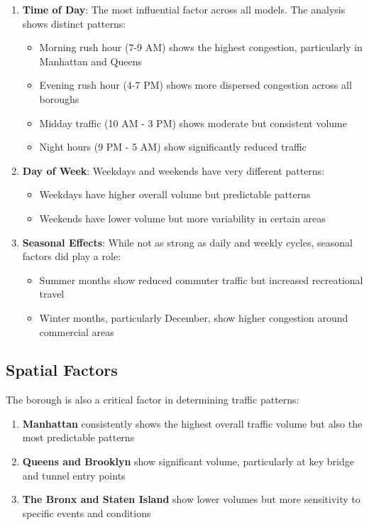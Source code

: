 \documentclass[
  letterpaper,
  DIV=11,
  numbers=noendperiod]{scrreprt}
\providecommand{\tightlist}{%
  \setlength{\itemsep}{0pt}\setlength{\parskip}{0pt}}\usepackage{longtable,booktabs,array}
\begin{document}
\begin{enumerate}
\def\labelenumi{\arabic{enumi}.}
\tightlist
\item
  \textbf{Time of Day}: The most influential factor across all models.
  The analysis shows distinct patterns:

  \begin{itemize}
  \tightlist
  \item
    Morning rush hour (7-9 AM) shows the highest congestion,
    particularly in Manhattan and Queens
  \item
    Evening rush hour (4-7 PM) shows more dispersed congestion across
    all boroughs
  \item
    Midday traffic (10 AM - 3 PM) shows moderate but consistent volume
  \item
    Night hours (9 PM - 5 AM) show significantly reduced traffic
  \end{itemize}
\item
  \textbf{Day of Week}: Weekdays and weekends have very different
  patterns:

  \begin{itemize}
  \tightlist
  \item
    Weekdays have higher overall volume but predictable patterns
  \item
    Weekends have lower volume but more variability in certain areas
  \end{itemize}
\item
  \textbf{Seasonal Effects}: While not as strong as daily and weekly
  cycles, seasonal factors did play a role:

  \begin{itemize}
  \tightlist
  \item
    Summer months show reduced commuter traffic but increased
    recreational travel
  \item
    Winter months, particularly December, show higher congestion around
    commercial areas
  \end{itemize}
\end{enumerate}

\subsection{Spatial Factors}\label{spatial-factors}

The borough is also a critical factor in determining traffic patterns:

\begin{enumerate}
\def\labelenumi{\arabic{enumi}.}
\tightlist
\item
  \textbf{Manhattan} consistently shows the highest overall traffic
  volume but also the most predictable patterns
\item
  \textbf{Queens and Brooklyn} show significant volume, particularly at
  key bridge and tunnel entry points
\item
  \textbf{The Bronx and Staten Island} show lower volumes but more
  sensitivity to specific events and conditions
\end{enumerate}
\end{document}
